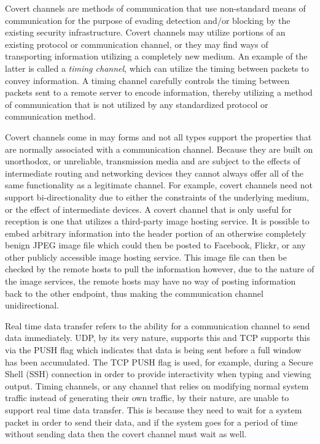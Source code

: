 \documentclass[12pt]{report}
\theoremstyle{remark}
\theoremstyle{definition}
\theoremstyle{definition}
\theoremstyle{definition}
\begin{document}
Covert channels are methods of communication that use non-standard means of
communication for the purpose of evading detection and/or blocking by the
existing security infrastructure. Covert channels may utilize portions of an
existing protocol\cite{Born2010.psudp} or communication channel, or they may find ways of
transporting information utilizing a completely new medium. An example of the
latter is called a \emph{timing channel}\cite{Sellke2009}, which can utilize the timing between
packets to convey information. A timing channel carefully controls the timing
between packets sent to a remote server to encode information, thereby utilizing
a method of communication that is not utilized by any standardized protocol
or communication method.

Covert channels come in may forms and not all types support the properties that
are normally associated with a communication channel. Because they are built on
unorthodox, or unreliable, transmission media and are subject to the effects of
intermediate routing and networking devices they cannot always offer all of the
same functionality as a legitimate channel. For example, covert channels need
not support bi-directionality due to either the constraints of the underlying
medium, or the effect of intermediate devices. A covert channel that is only
useful for reception is one that utilizes a third-party image hosting service.
It is possible to embed arbitrary information into the header portion of an
otherwise completely benign JPEG image file\cite{isoeic10918-1} which could then
be posted to Facebook, Flickr, or any other publicly accessible image hosting
service. This image file can then be checked by the remote hosts to pull the
information however, due to the nature of the image services, the remote hosts
may have no way of posting information back to the other endpoint, thus making
the communication channel unidirectional.

Real time data transfer refers to the ability for a communication channel to
send data immediately. UDP, by its very nature, supports this and TCP supports
this via the PUSH flag which indicates that data is being sent before a full
window has been accumulated. The TCP PUSH flag is used, for example, during a
Secure Shell (SSH) connection in order to provide interactivity when typing and
viewing output. Timing channels, or any channel that relies on modifying normal
system traffic instead of generating their own traffic, by their nature, are
unable to support real time data transfer. This is because they need to wait for
a system packet in order to send their data, and if the system goes for a period
of time without sending data then the covert channel must wait as well.
\end{document}
